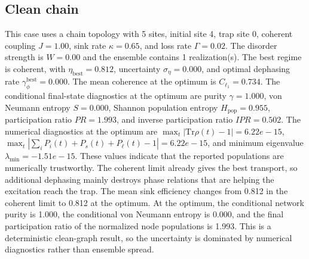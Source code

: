 \subsection{Clean chain}
This case uses a chain topology with 5 sites, initial site 4, trap site 0, coherent coupling $J=1.00$, sink rate $\kappa=0.65$, and loss rate $\Gamma=0.02$. The disorder strength is $W=0.00$ and the ensemble contains 1 realization(s).
The best regime is coherent, with $\eta_{\mathrm{best}}=0.812$, uncertainty $\sigma_\eta=0.000$, and optimal dephasing rate $\gamma_\phi^{\mathrm{best}}=0.000$. The mean coherence at the optimum is $C_{\ell_1}=0.734$.
The conditional final-state diagnostics at the optimum are purity $\gamma=1.000$, von Neumann entropy $S=0.000$, Shannon population entropy $H_\mathrm{pop}=0.955$, participation ratio $PR=1.993$, and inverse participation ratio $IPR=0.502$.
The numerical diagnostics at the optimum are $\max_t |\mathrm{Tr}\rho(t)-1|=6.22e-15$, $\max_t |\sum_i P_i(t)+P_s(t)+P_\ell(t)-1|=6.22e-15$, and minimum eigenvalue $\lambda_\mathrm{min}=-1.51e-15$. These values indicate that the reported populations are numerically trustworthy.
The coherent limit already gives the best transport, so additional dephasing mainly destroys phase relations that are helping the excitation reach the trap. The mean sink efficiency changes from 0.812 in the coherent limit to 0.812 at the optimum. At the optimum, the conditional network purity is 1.000, the conditional von Neumann entropy is 0.000, and the final participation ratio of the normalized node populations is 1.993. This is a deterministic clean-graph result, so the uncertainty is dominated by numerical diagnostics rather than ensemble spread.

